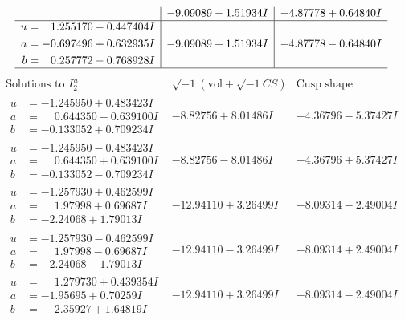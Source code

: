 \documentclass[1p]{elsarticle_modified}
\theoremstyle{definition}
\newcommand{\I}{\sqrt{-1}}
\begin{document}
$$\begin{array}{c|c|c}
 & -9.09089 - 1.51934 I & -4.87778 + 0.64840 I \\ \hline\begin{aligned}
u &= \phantom{-}1.255170 - 0.447404 I \\
a &= -0.697496 + 0.632935 I \\
b &= \phantom{-}0.257772 - 0.768928 I\end{aligned}
 & -9.09089 + 1.51934 I & -4.87778 - 0.64840 I\\
 \hline 
 \end{array}$$\newpage$$\begin{array}{c|c|c}  
\text{Solutions to }I^u_{2}& \I (\text{vol} + \sqrt{-1}CS) & \text{Cusp shape}\\
 \hline 
\begin{aligned}
u &= -1.245950 + 0.483423 I \\
a &= \phantom{-}0.644350 - 0.639100 I \\
b &= -0.133052 + 0.709234 I\end{aligned}
 & -8.82756 + 8.01486 I & -4.36796 - 5.37427 I \\ \hline\begin{aligned}
u &= -1.245950 - 0.483423 I \\
a &= \phantom{-}0.644350 + 0.639100 I \\
b &= -0.133052 - 0.709234 I\end{aligned}
 & -8.82756 - 8.01486 I & -4.36796 + 5.37427 I \\ \hline\begin{aligned}
u &= -1.257930 + 0.462599 I \\
a &= \phantom{-}1.97998 + 0.69687 I \\
b &= -2.24068 + 1.79013 I\end{aligned}
 & -12.94110 + 3.26499 I & -8.09314 - 2.49004 I \\ \hline\begin{aligned}
u &= -1.257930 - 0.462599 I \\
a &= \phantom{-}1.97998 - 0.69687 I \\
b &= -2.24068 - 1.79013 I\end{aligned}
 & -12.94110 - 3.26499 I & -8.09314 + 2.49004 I \\ \hline\begin{aligned}
u &= \phantom{-}1.279730 + 0.439354 I \\
a &= -1.95695 + 0.70259 I \\
b &= \phantom{-}2.35927 + 1.64819 I\end{aligned}
 & -12.94110 + 3.26499 I & -8.09314 - 2.49004 I \\ \hline\begin{aligned}

\end{aligned}
\end{array}$$
\end{document}
